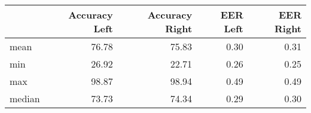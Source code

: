 \begin{tabular}{lrrrr}
\toprule
{} &  Accuracy Left &  Accuracy Right &  EER Left &  EER Right \\
\midrule
mean   &          76.78 &           75.83 &      0.30 &       0.31 \\
min    &          26.92 &           22.71 &      0.26 &       0.25 \\
max    &          98.87 &           98.94 &      0.49 &       0.49 \\
median &          73.73 &           74.34 &      0.29 &       0.30 \\
\bottomrule
\end{tabular}
